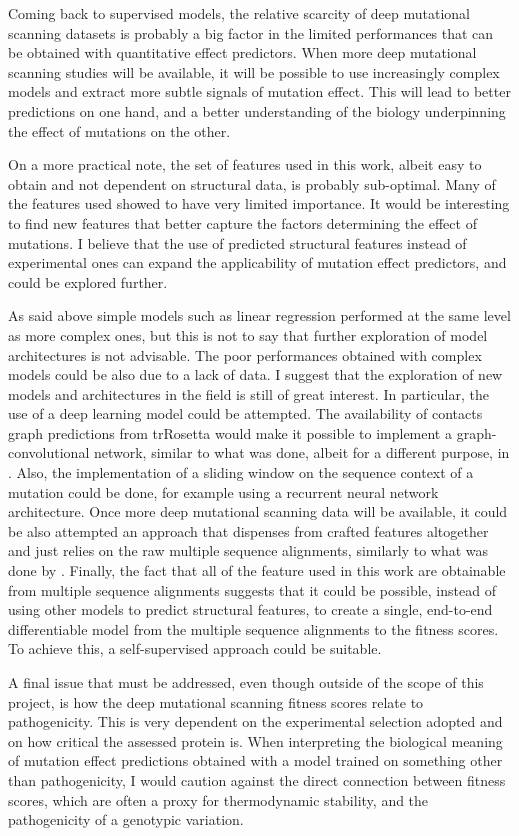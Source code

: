 Coming back to supervised models, the relative scarcity of deep mutational scanning datasets is probably a big factor in the limited performances that can be obtained with quantitative effect predictors.
When more deep mutational scanning studies will be available, it will be possible to use increasingly complex models and extract more subtle signals of mutation effect.
This will lead to better predictions on one hand, and a better understanding of the biology underpinning the effect of mutations on the other.

On a more practical note, the set of features used in this work, albeit easy to obtain and not dependent on structural data, is probably sub-optimal.
Many of the features used showed to have very limited importance.
It would be interesting to find new features that better capture the factors determining the effect of mutations.
I believe that the use of predicted structural features instead of experimental ones can expand the applicability of mutation effect predictors, and could be explored further.

As said above simple models such as linear regression performed at the same level as more complex ones, but this is not to say that further exploration of model architectures is not advisable.
The poor performances obtained with complex models could be also due to a lack of data.
I suggest that the exploration of new models and architectures in the field is still of great interest.
In particular, the use of a deep learning model could be attempted.
The availability of contacts graph predictions from trRosetta would make it possible to implement a graph-convolutional network, similar to what was done, albeit for a different purpose, in \textcite{Baldassarre2020}.
Also, the implementation of a sliding window on the sequence context of a mutation could be done, for example using a recurrent neural network architecture.
Once more deep mutational scanning data will be available, it could be also attempted an approach that dispenses from crafted features altogether and just relies on the raw multiple sequence alignments, similarly to what was done by \textcite{Mirabello2019}.
Finally, the fact that all of the feature used in this work are obtainable from multiple sequence alignments suggests that it could be possible, instead of using other models to predict structural features, to create a single, end-to-end differentiable model from the multiple sequence alignments to the fitness scores.
To achieve this, a self-supervised approach could be suitable.

A final issue that must be addressed, even though outside of the scope of this project, is how the deep mutational scanning fitness scores relate to pathogenicity.
This is very dependent on the experimental selection adopted and on how critical the assessed protein is.
When interpreting the biological meaning of mutation effect predictions obtained with a model trained on something other than pathogenicity, I would caution against the direct connection between fitness scores, which are often a proxy for thermodynamic stability, and the pathogenicity of a genotypic variation.
